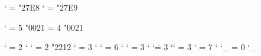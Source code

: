 \Udelcode `\< = \delimiterfam "27E8
\Udelcode `\> = \delimiterfam "27E9
\def\|{\Udelimiter 0 \delimiterfam "2016 }

\Umathcode `\! = 5 \ordfam "0021
\Umathchardef \mathexclam = 4 \ordfam "0021

\Umathcode `\* = 2 \binfam `\*
\Umathcode `\- = 2 \binfam "2212
\Umathcode `\: = 3 \ordfam `\:
\Umathcode `\; = 6 \ordfam `\;
\Umathcode `\< = 3 \binfam `\<
\Umathcode `\= = 3 \binfam `\=
\Umathcode `\> = 3 \binfam `\>
\Umathchardef \colon = 7 \ordfam `\:
\Umathcode `\_ = 0 \ordfam `\_

